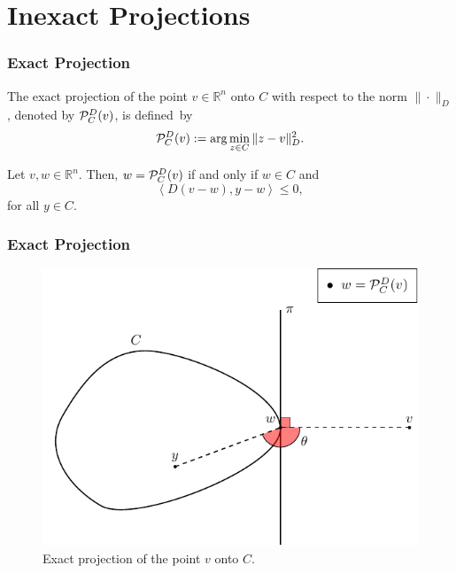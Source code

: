 \section{Inexact Projections}

\begin{frame}
  \frametitle{Exact Projection}

  \begin{definition}[2.1]
    The \textcolor{UFGred}{exact  projection} of the point $v\in \mathbb{R}^{n}$ onto $C$ with respect to the norm $\| \cdot \| _{D}$, denoted by  ${\cal P}_{C}^{D}(v)$, is  defined~by
    \begin{equation*}
      {\cal P}_{C}^{D}(v):=\arg \min _{z\in C}\|z-v\|^2_{D}.
    \end{equation*}
  \end{definition}

  \begin{lemma}[2.2]
    Let $v, w \in {\mathbb R}^n$.  Then,  $w={\cal P}_{C}^{D}(v)$ if and only if  $w\in C$ and
    \[
      \left\langle D(v-w), y-w\right\rangle \leq  0,
    \]
    for all $y \in C.$
  \end{lemma}
\end{frame}

\begin{frame}[t]\frametitle{Exact Projection}\bigskip
  \begin{figure}[!ht]
    \centering
    \includegraphics{../figures/exactProj.pdf}
    \caption{Exact projection of the point $v$ onto $C$.}
    \label{fig:exactProj}
  \end{figure}
\end{frame}


